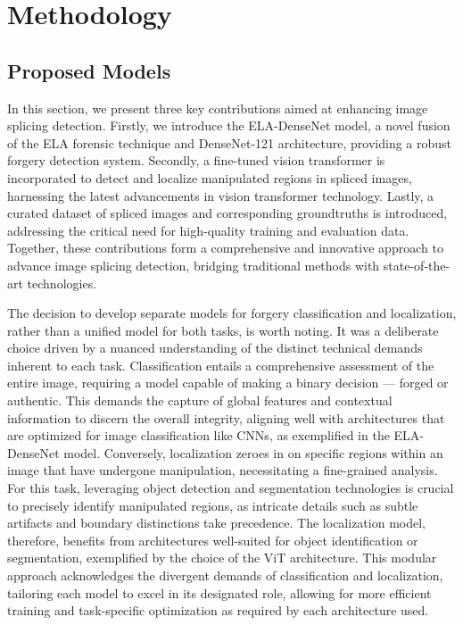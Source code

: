 \chapter{Methodology}\label{chap:method}


  \section{Proposed Models } \label{sec:s3}
  
In this section, we present three key contributions aimed at enhancing image splicing detection. Firstly, we introduce the ELA-DenseNet model, a novel fusion of the ELA forensic technique and DenseNet-121 architecture, providing a robust forgery detection system. Secondly, a fine-tuned vision transformer is incorporated to detect and localize manipulated regions in spliced images, harnessing the latest advancements in vision transformer technology. Lastly, a curated dataset of spliced images and corresponding groundtruths is introduced, addressing the critical need for high-quality training and evaluation data. Together, these contributions form a comprehensive and innovative approach to advance image splicing detection, bridging traditional methods with state-of-the-art technologies.

The decision to develop separate models for forgery classification and localization, rather than a unified model for both tasks, is worth noting. It was a deliberate choice driven by a nuanced understanding of the distinct technical demands inherent to each task. Classification entails a comprehensive assessment of the entire image, requiring a model capable of making a binary decision — forged or authentic. This demands the capture of global features and contextual information to discern the overall integrity, aligning well with architectures that are optimized for image classification like CNNs, as exemplified in the ELA-DenseNet model. Conversely, localization zeroes in on specific regions within an image that have undergone manipulation, necessitating a fine-grained analysis. For this task, leveraging object detection and segmentation technologies is crucial to precisely identify manipulated regions, as intricate details such as subtle artifacts and boundary distinctions take precedence. The localization model, therefore, benefits from architectures well-suited for object identification or segmentation, exemplified by the choice of the ViT architecture. This modular approach acknowledges the divergent demands of classification and localization, tailoring each model to excel in its designated role, allowing for more efficient training and task-specific optimization as required by each architecture used.


